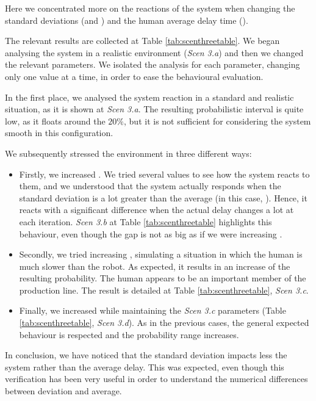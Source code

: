 Here we concentrated more on the reactions of the system when changing the standard deviations (\vH \space and \vT) and the human average delay time (\mH).

The relevant results are collected at Table \ref{tab:scenthreetable}. We began analysing the system in a realistic environment (\emph{Scen 3.a}) and then we changed the relevant parameters. We isolated the analysis for each parameter, changing only one value at a time, in order to ease the behavioural evaluation.

In the first place, we analysed the system reaction in a standard and realistic situation, as it is shown at \emph{Scen 3.a}. The resulting probabilistic interval is quite low, as it floats around the $20\%$, but it is not sufficient for considering the system smooth in this configuration.

We subsequently stressed the environment in three different ways:
\begin{itemize}
    \item Firstly, we increased \vT. We tried several values to see how the system reacts to them, and we understood that the system actually responds when the standard deviation is a lot greater than the average (in this case, \mT). Hence, it reacts with a significant difference when the actual delay changes a lot at each iteration. \emph{Scen 3.b} at Table \ref{tab:scenthreetable} highlights this behaviour, even though the gap is not as big as if we were increasing \mT.
    \item Secondly, we tried increasing \mH, simulating a situation in which the human is much slower than the robot. As expected, it results in an increase of the resulting probability. The human appears to be an important member of the production line. The result is detailed at Table \ref{tab:scenthreetable}, \emph{Scen 3.c}.
    \item Finally, we increased \vH while maintaining the \emph{Scen 3.c} parameters (Table \ref{tab:scenthreetable}, \emph{Scen 3.d}). As in the previous cases, the general expected behaviour is respected and the probability range increases.
\end{itemize}

In conclusion, we have noticed that the standard deviation impacts less the system rather than the average delay. This was expected, even though this verification has been very useful in order to understand the numerical differences between deviation and average.